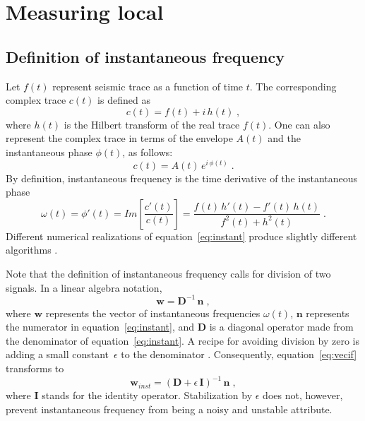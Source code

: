 \section{Measuring local  }


\subsection{Definition of instantaneous frequency}

Let $f(t)$ represent seismic trace as a function of time $t$. The
corresponding complex trace $c(t)$ is defined as
\begin{equation}
  c(t) = f(t) + i\,h(t)\;,
  \label{eq:complex}
\end{equation}
where $h(t)$ is the Hilbert transform of the real trace $f(t)$. One
can also represent the complex trace in terms of the envelope $A(t)$
and the instantaneous phase $\phi(t)$, as follows:
\begin{equation}
  \label{eq:polar}
  c(t) = A(t)\,e^{i\,\phi(t)}\;.
\end{equation}
By definition, instantaneous frequency is the time derivative of the
instantaneous phase \cite[]{GEO44-06-10411063}
\begin{equation}
  \label{eq:instant}
  \omega(t) = \phi'(t) = \mathit{Im}\left[\frac{c'(t)}{c(t)}\right]
  = \frac{f(t)\,h'(t) - f'(t)\,h(t)}{f^2(t) + h^2(t)}\;.
\end{equation}
Different numerical realizations of equation~\ref{eq:instant} produce
slightly different algorithms \cite[]{GEO57-11-15201524}.

Note that the definition of instantaneous frequency calls for division
of two signals. In a linear algebra notation,
\begin{equation}
  \label{eq:vecif}
  \mathbf{w} = \mathbf{D}^{-1}\,\mathbf{n}\;,
\end{equation}
where $\mathbf{w}$ represents the vector of instantaneous frequencies
$\omega(t)$, $\mathbf{n}$ represents the numerator in
equation~\ref{eq:instant}, and $\mathbf{D}$ is a diagonal operator
made from the denominator of equation~\ref{eq:instant}. A recipe for
avoiding division by zero is adding a small constant~$\epsilon$ to the
denominator \cite[]{nowack}. Consequently, equation~\ref{eq:vecif}
transforms to
\begin{equation}
  \label{eq:vecife}
  \mathbf{w}_{inst} = \left(\mathbf{D}+\epsilon\,\mathbf{I}\right)^{-1}\,\mathbf{n}\;,
\end{equation}
where $\mathbf{I}$ stands for the identity operator. Stabilization by
$\epsilon$ does not, however, prevent instantaneous frequency from
being a noisy and unstable attribute. 

